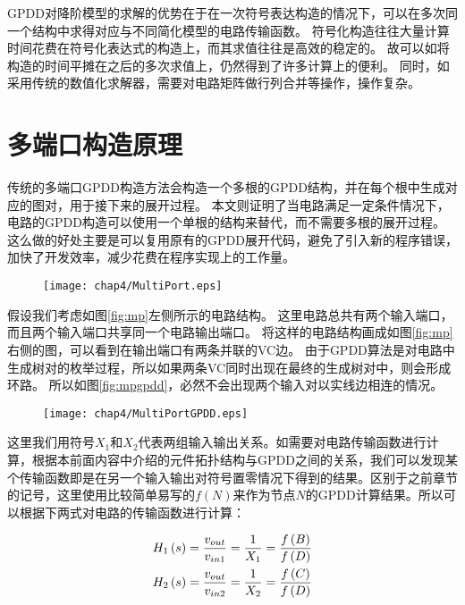 GPDD对降阶模型的求解的优势在于在一次符号表达构造的情况下，可以在多次同一个结构中求得对应与不同简化模型的电路传输函数。
符号化构造往往大量计算时间花费在符号化表达式的构造上，而其求值往往是高效的稳定的。
故可以如将构造的时间平摊在之后的多次求值上，仍然得到了许多计算上的便利。
同时，如采用传统的数值化求解器，需要对电路矩阵做行列合并等操作，操作复杂。

\section{多端口构造原理}
\label{sec:mp}

传统的多端口GPDD构造方法会构造一个多根的GPDD结构，并在每个根中生成对应的图对，用于接下来的展开过程\parencite{GShi-GPDD-2013}。
本文则证明了当电路满足一定条件情况下，电路的GPDD构造可以使用一个单根的结构来替代，而不需要多根的展开过程。
这么做的好处主要是可以复用原有的GPDD展开代码，避免了引入新的程序错误，加快了开发效率，减少花费在程序实现上的工作量。

\begin{figure}[!htp]
	\centering
	\texttt{[image: chap4/MultiPort.eps]}
\end{figure}

假设我们考虑如图\ref{fig:mp}左侧所示的电路结构。
这里电路总共有两个输入端口，而且两个输入端口共享同一个电路输出端口。
将这样的电路结构画成如图\ref{fig:mp}右侧的图，可以看到在输出端口有两条并联的VC边。
由于GPDD算法是对电路中生成树对的枚举过程，所以如果两条VC同时出现在最终的生成树对中，则会形成环路。
所以如图\ref{fig:mpgpdd}，必然不会出现两个输入对以实线边相连的情况。

\begin{figure}[!htp]
	\centering
	\texttt{[image: chap4/MultiPortGPDD.eps]}
\end{figure}

这里我们用符号$X_1$和$X_2$代表两组输入输出关系。如需要对电路传输函数进行计算，根据本前面内容中介绍的元件拓扑结构与GPDD之间的关系，我们可以发现某个传输函数即是在另一个输入输出对符号置零情况下得到的结果。区别于之前章节的记号，这里使用比较简单易写的$f\left( N \right)$来作为节点$N$的GPDD计算结果。所以可以根据下两式对电路的传输函数进行计算：

\begin{eqnarray}
{H_1}\left( s \right) = \frac{{{v_{out}}}}
{{{v_{in1}}}} = \frac{1}
{{{X_1}}} = \frac{{f\left( B \right)}}
{{f\left( D \right)}} \hfill \\
{H_2}\left( s \right) = \frac{{{v_{out}}}}
{{{v_{in2}}}} = \frac{1}
{{{X_2}}} = \frac{{f\left( C \right)}}
{{f\left( D \right)}} \hfill 
\end{eqnarray}

